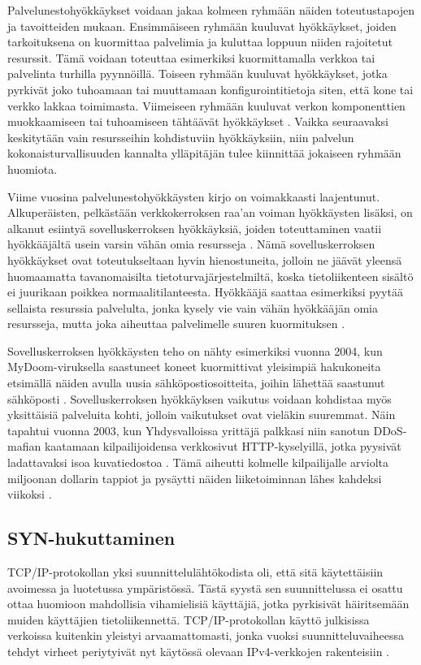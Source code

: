 Palvelunestohyökkäykset voidaan jakaa kolmeen ryhmään näiden
toteutustapojen ja tavoitteiden mukaan. Ensimmäiseen ryhmään kuuluvat
hyökkäykset, joiden tarkoituksena on kuormittaa palvelimia ja kuluttaa
loppuun niiden rajoitetut resurssit. Tämä voidaan toteuttaa esimerkiksi
kuormittamalla verkkoa tai palvelinta turhilla pyynnöillä. Toiseen
ryhmään kuuluvat hyökkäykset, jotka pyrkivät joko tuhoamaan tai
muuttamaan konfigurointitietoja siten, että kone tai verkko lakkaa
toimimasta. Viimeiseen ryhmään kuuluvat verkon komponenttien
muokkaamiseen tai tuhoamiseen tähtäävät hyökkäykset
\cite{CERT}. Vaikka seuraavaksi keskitytään vain resursseihin
kohdistuviin hyökkäyksiin, niin palvelun kokonaisturvallisuuden
kannalta ylläpitäjän tulee kiinnittää jokaiseen ryhmään
huomiota.

Viime vuosina palvelunestohyökkäysten kirjo on voimakkaasti
laajentunut. Alkuperäisten, pelkästään verkkokerroksen raa’an voiman
hyökkäysten lisäksi, on alkanut esiintyä sovelluskerroksen
hyökkäyksiä, joiden toteuttaminen vaatii hyökkääjältä usein varsin
vähän omia resursseja \cite{Hacking}. Nämä sovelluskerroksen
hyökkäykset ovat toteutukseltaan hyvin hienostuneita, jolloin ne
jäävät yleensä huomaamatta tavanomaisilta tietoturvajärjestelmiltä,
koska tietoliikenteen sisältö ei juurikaan poikkea
normaalitilanteesta. Hyökkääjä saattaa esimerkiksi pyytää sellaista
resurssia palvelulta, jonka kysely vie vain vähän hyökkääjän omia
resursseja, mutta joka aiheuttaa palvelimelle suuren kuormituksen
\cite{DDOSb}.

Sovelluskerroksen hyökkäysten teho on nähty esimerkiksi vuonna 2004, kun
MyDoom-\-viruksella saastuneet koneet kuormittivat yleisimpiä
hakukoneita etsimällä näiden avulla uusia sähköpostiosoitteita, joihin
lähettää saastunut sähköposti \cite{Hacking}. Sovelluskerroksen
hyökkäyksen vaikutus voidaan kohdistaa myös yksittäisiä palveluita
kohti, jolloin vaikutukset ovat vieläkin suuremmat. Näin tapahtui
vuonna 2003, kun Yhdysvalloissa yrittäjä palkkasi niin sanotun DDoS-mafian
kaatamaan kilpailijoidensa verkkosivut HTTP-kyselyillä, jotka pyysivät
ladattavaksi isoa kuvatiedostoa \cite{DDOSb}. Tämä aiheutti kolmelle
kilpailijalle arviolta miljoonan dollarin tappiot ja pysäytti
näiden liiketoiminnan lähes kahdeksi viikoksi \cite{FBI}.

\subsection{SYN-hukuttaminen}
TCP/IP-protokollan yksi suunnittelulähtökodista oli, että sitä
käytettäisiin avoimessa ja luotetussa ympäristössä. Tästä syystä sen
suunnittelussa ei osattu ottaa huomioon mahdollisia vihamielisiä
käyttäjiä, jotka pyrkisivät häiritsemään muiden käyttäjien
tietoliikennettä. TCP/IP-protokollan käyttö julkisissa verkoissa kuitenkin
yleistyi arvaamattomasti, jonka vuoksi suunnitteluvaiheessa tehdyt
virheet periytyivät nyt käytössä olevaan IPv4-verkkojen rakenteisiin
\cite{Hacking}.

